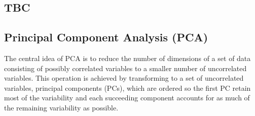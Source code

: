 %
%
%
%

\subsection{TBC}


\subsection{Principal Component Analysis (PCA)}
The central idea of PCA is to reduce the number of dimensions of a set of data consisting of possibly correlated variables to a smaller number of uncorrelated variables. This operation is achieved by transforming to a set of uncorrelated variables, principal components (PCs), which are ordered so the first PC retain most of the variability and each succeeding component accounts for as much of the remaining variability as possible.

